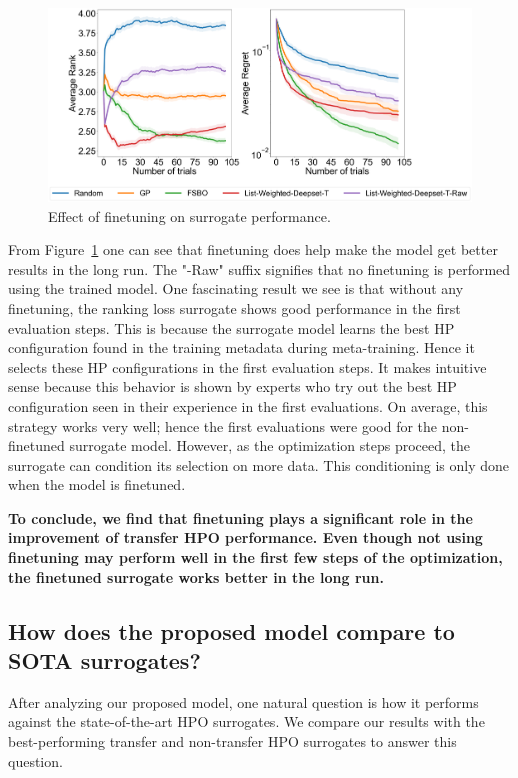 \documentclass[12pt, twoside, ngerman]{report}
\begin{document}
\begin{figure}[h]
  \centering
    \includegraphics[scale=0.25]{images/FineTuningAblation}
    \caption{Effect of finetuning on surrogate performance.}
    \label{fig:FineTuningAblation}
\end{figure}

From Figure~\ref{fig:FineTuningAblation} one can see that finetuning does help make the model get better results in the long run.
The "-Raw" suffix signifies that no finetuning is performed using the trained model.
One fascinating result we see is that without any finetuning, the ranking loss surrogate shows good performance in the first evaluation steps.
This is because the surrogate model learns the best HP configuration found in the training metadata during meta-training.
Hence it selects these HP configurations in the first evaluation steps.
It makes intuitive sense because this behavior is shown by experts who try out the best HP configuration seen in their experience in the first evaluations. On average, this strategy works very well; hence the first evaluations were good for the non-finetuned surrogate model.
However, as the optimization steps proceed, the surrogate can condition its selection on more data. This conditioning is only done when the model is finetuned. 

\textbf{To conclude, we find that finetuning plays a significant role in the improvement of transfer HPO performance. Even though not using finetuning may perform well in the first few steps of the optimization,  the finetuned surrogate works better in the long run.}

\subsection{How does the proposed model compare to SOTA surrogates?}
After analyzing our proposed model, one natural question is how it performs against the state-of-the-art HPO surrogates. We compare our results with the best-performing transfer and non-transfer HPO surrogates to answer this question.
\end{document}

